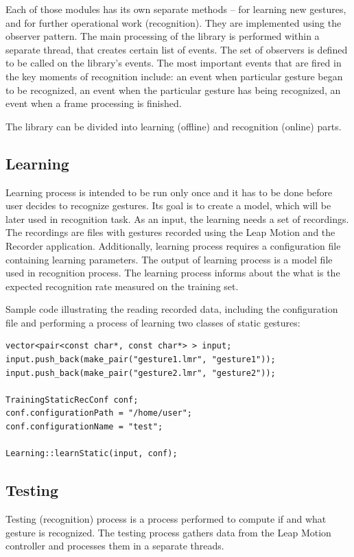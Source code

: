 Each of those modules has its own separate methods -- for learning new gestures, and for further operational work (recognition). They are implemented using the observer pattern.
The main processing of the library is performed within a separate thread, that creates certain list of events.
The set of observers is defined to be called on the library's events.
The most important events that are fired in the key moments of recognition include: an event when particular gesture began to be recognized, an event when the particular gesture has being recognized, an event when a frame processing is finished.

The library can be divided into learning (offline) and recognition (online) parts.

\subsection{Learning}

Learning process is intended to be run only once and it has to be done before user decides to recognize gestures. Its goal is to create a model, which will be later used in recognition task. As an input, the learning needs a set of recordings. The recordings are files with gestures recorded using the Leap Motion and the Recorder application. Additionally, learning process requires a configuration file containing learning parameters. The output of learning process is a model file used in recognition process.
The learning process informs about the what is the expected recognition rate measured on the training set.

Sample code illustrating the reading recorded data, including the configuration file and performing a process of learning two classes of static gestures:
\begin{lstlisting}
vector<pair<const char*, const char*> > input;
input.push_back(make_pair("gesture1.lmr", "gesture1"));
input.push_back(make_pair("gesture2.lmr", "gesture2"));

TrainingStaticRecConf conf;
conf.configurationPath = "/home/user";
conf.configurationName = "test";

Learning::learnStatic(input, conf);
\end{lstlisting}


\subsection{Testing}

Testing (recognition) process is a process performed to compute if and what gesture is recognized.
The testing process gathers data from the Leap Motion controller and processes them in a separate threads.

